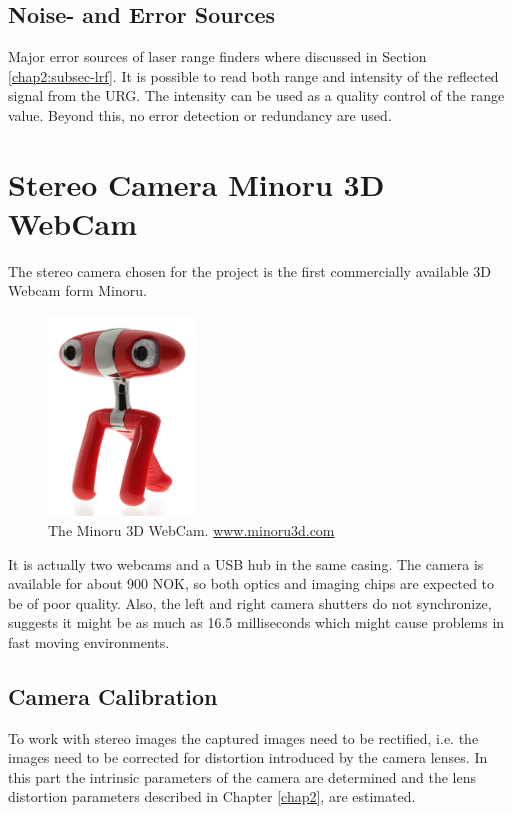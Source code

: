 \subsection{Noise- and Error Sources}
Major error sources of laser range finders where discussed in Section \ref{chap2:subsec-lrf}. It is
possible to read both range and intensity of the reflected signal from the URG. The
intensity can be used as a quality control of the range value. Beyond this, no error
detection or redundancy are used. 



\section{Stereo Camera Minoru 3D WebCam}
The stereo camera chosen for the project is the first commercially available 3D Webcam
form Minoru.
\begin{figure}[htbp]
    \centering
    \includegraphics[width=0.35\textwidth]{pics/minoru3d}
    \caption{The Minoru 3D WebCam. \url{www.minoru3d.com}}
    \label{chap3:fig-minoru}
\end{figure}
It is actually two webcams and a USB hub in the same casing. The camera is
available for about 900 NOK, so both optics and imaging chips are expected to be of poor
quality. Also, the left and right camera shutters do not synchronize, \cite{nma-web}
suggests it might be as much as 16.5 milliseconds which might cause problems in fast
moving environments. 


\subsection{Camera Calibration}
To work with stereo images the captured images need to be rectified, i.e. the images need
to be corrected for distortion introduced by the camera lenses. In this part 
the intrinsic parameters of the camera are determined and the lens distortion parameters 
described in Chapter \ref{chap2}, are estimated. 

